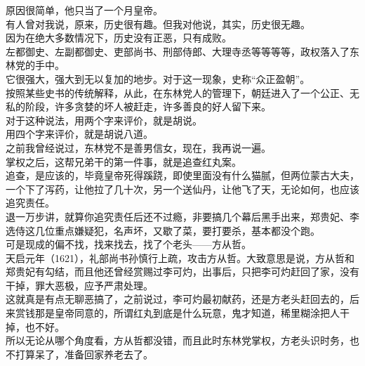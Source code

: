 \begin{multicols}{\theparacolNo}
原因很简单，他只当了一个月皇帝。\\

有人曾对我说，原来，历史很有趣。但我对他说，其实，历史很无趣。\\

因为在绝大多数情况下，历史没有正恶，只有成败。\\

左都御史、左副都御史、吏部尚书、刑部侍郎、大理寺丞等等等等，政权落入了东林党的手中。\\

它很强大，强大到无以复加的地步。对于这一现象，史称“众正盈朝”。\\

按照某些史书的传统解释，从此，在东林党人的管理下，朝廷进入了一个公正、无私的阶段，许多贪婪的坏人被赶走，许多善良的好人留下来。\\

对于这种说法，用两个字来评价，就是胡说。\\

用四个字来评价，就是胡说八道。\\

之前我曾经说过，东林党不是善男信女，现在，我再说一遍。\\

掌权之后，这帮兄弟干的第一件事，就是追查红丸案。\\

追查，是应该的，毕竟皇帝死得蹊跷，即使里面没有什么猫腻，但两位蒙古大夫，一个下了泻药，让他拉了几十次，另一个送仙丹，让他飞了天，无论如何，也应该追究责任。\\

退一万步讲，就算你追究责任后还不过瘾，非要搞几个幕后黑手出来，郑贵妃、李选侍这几位重点嫌疑犯，名声坏，又歇了菜，要打要杀，基本都没个跑。\\

可是现成的偏不找，找来找去，找了个老头——方从哲。\\

天启元年（1621），礼部尚书孙慎行上疏，攻击方从哲。大致意思是说，方从哲和郑贵妃有勾结，而且他还曾经赏赐过李可灼，出事后，只把李可灼赶回了家，没有干掉，罪大恶极，应予严肃处理。\\

这就真是有点无聊恶搞了，之前说过，李可灼最初献药，还是方老头赶回去的，后来赏钱那是皇帝同意的，所谓红丸到底是什么玩意，鬼才知道，稀里糊涂把人干掉，也不好。\\

所以无论从哪个角度看，方从哲都没错，而且此时东林党掌权，方老头识时务，也不打算呆了，准备回家养老去了。\\


\end{multicols}
